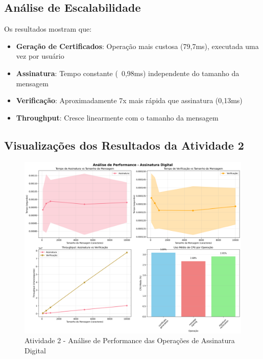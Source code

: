 \documentclass[12pt,a4paper,oneside]{article}
\begin{document}
\subsection{Análise de Escalabilidade}

Os resultados mostram que:

\begin{itemize}
    \item \textbf{Geração de Certificados}: Operação mais custosa (79,7ms), executada uma vez por usuário
    \item \textbf{Assinatura}: Tempo constante (~0,98ms) independente do tamanho da mensagem
    \item \textbf{Verificação}: Aproximadamente 7x mais rápida que assinatura (0,13ms)
    \item \textbf{Throughput}: Cresce linearmente com o tamanho da mensagem
\end{itemize}

\subsection{Visualizações dos Resultados da Atividade 2}

\begin{figure}[H]
\centering
\includegraphics[width=\textwidth]{atividade2/results/signature_performance_analysis.png}
\caption{Atividade 2 - Análise de Performance das Operações de Assinatura Digital}
\label{fig:signature_performance}
\end{figure}
\end{document}
